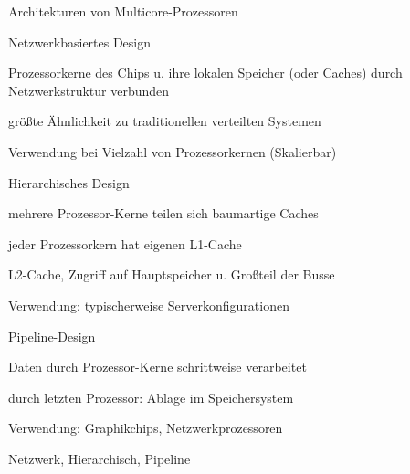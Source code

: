 \documentclass[a4paper]{article}
\begin{document}
\begin{multicols}{3}
    Architekturen von Multicore-Prozessoren
    \begin{itemize*}
        \item Netzwerkbasiertes Design
        \begin{itemize*}
            \item Prozessorkerne des Chips u. ihre lokalen Speicher (oder Caches) durch Netzwerkstruktur verbunden
            \item größte Ähnlichkeit zu traditionellen verteilten Systemen
            \item Verwendung bei Vielzahl von Prozessorkernen (Skalierbar)
        \end{itemize*}
        \item Hierarchisches Design
        \begin{itemize*}
            \item mehrere Prozessor-Kerne teilen sich baumartige Caches
            \item jeder Prozessorkern hat eigenen L1-Cache
            \item L2-Cache, Zugriff auf Hauptspeicher u. Großteil der Busse %
            \item Verwendung: typischerweise Serverkonfigurationen
        \end{itemize*}
        \item Pipeline-Design
        \begin{itemize*}
            \item Daten durch Prozessor-Kerne schrittweise verarbeitet
            \item durch letzten Prozessor: Ablage im Speichersystem
            \item Verwendung: Graphikchips, Netzwerkprozessoren
        \end{itemize*}
    \end{itemize*}

    \begin{center}
    Netzwerk, Hierarchisch, Pipeline


\end{center}
\end{multicols}
\end{document}
